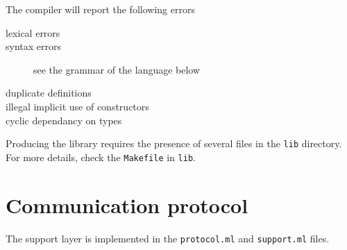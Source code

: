 The compiler will report the following errors
\begin{description}
\item[lexical errors]
\item[syntax errors] see the grammar of the language below
\item[duplicate definitions]
\item[illegal implicit use of constructors]
\item[cyclic dependancy on types]
\end{description} 

Producing the library requires the presence of several files in the
\verb|lib| directory. For more details, check the \verb|Makefile| in
\verb|lib|. 

\section{Communication protocol}
The support layer is implemented in the \verb|protocol.ml| and
\verb|support.ml| files.


\tableofcontents
\appendix
